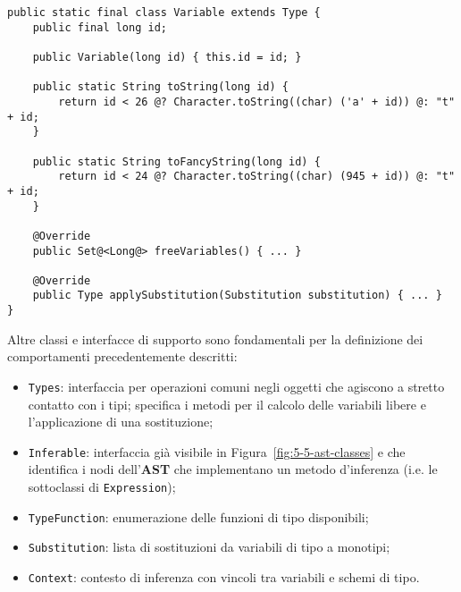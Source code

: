 \begin{lstlisting}[caption={Esempio di sottoclasse di \texttt{Type}}, style=javaCode, label={lst:5-8-hm-class-java}]
public static final class Variable extends Type {
    public final long id;
    
    public Variable(long id) { this.id = id; }

    public static String toString(long id) {
        return id < 26 @? Character.toString((char) ('a' + id)) @: "t" + id;
    }

    public static String toFancyString(long id) {
        return id < 24 @? Character.toString((char) (945 + id)) @: "t" + id;
    }

    @Override
    public Set@<Long@> freeVariables() { ... }

    @Override
    public Type applySubstitution(Substitution substitution) { ... }
}
\end{lstlisting}
\vspace{4mm}

\noindent Altre classi e interfacce di supporto sono fondamentali per la definizione dei comportamenti precedentemente descritti:
\begin{itemize}
    \item \texttt{Types}: interfaccia per operazioni comuni negli oggetti che agiscono a stretto contatto con i tipi;
          specifica i metodi per il calcolo delle variabili libere e l'applicazione di una sostituzione;
    \item \texttt{Inferable}: interfaccia già visibile in Figura~\ref{fig:5-5-ast-classes} e che identifica i nodi
          dell'\textbf{AST} che implementano un metodo d'inferenza (i.e. le sottoclassi di \texttt{Expression});
    \item \texttt{TypeFunction}: enumerazione delle funzioni di tipo disponibili;
    \item \texttt{Substitution}: lista di sostituzioni da variabili di tipo a monotipi;
    \item \texttt{Context}: contesto di inferenza con vincoli tra variabili e schemi di tipo.
\end{itemize}

\newpage

